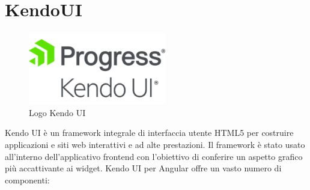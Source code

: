 \section{KendoUI}
\begin{figure}[ht!]
\begin{center}
  \includegraphics[width=6cm]{images/kendo_logo.png}
  \caption{Logo Kendo UI}
\end{center}
\end{figure}
Kendo UI è un framework integrale di interfaccia utente HTML5 per costruire applicazioni e siti web interattivi e ad alte prestazioni. \cite{KENDO}
Il framework è stato usato all'interno dell'applicativo frontend con l'obiettivo di conferire un aspetto grafico più accattivante ai widget. Kendo UI per Angular offre un vasto numero di componenti:

